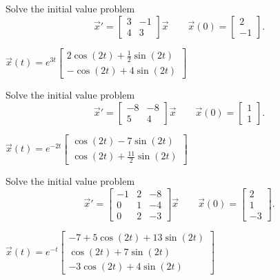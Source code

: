 \begin{exercise}
Solve the initial value problem
\[ {\vec{x}}' = \begin{bmatrix} 3 & -1 \\ 4 & 3 \end{bmatrix} \vec{x} \qquad \vec{x}(0) = \begin{bmatrix} 2 \\ -1 \end{bmatrix}. \]
\end{exercise}
\comboSol{%
}
{%
$\vec{x}(t) = e^{3t} \left[\begin{smallmatrix}2\cos(2t) + \frac{1}{2}\sin(2t) \\ -\cos(2t) + 4\sin(2t) \end{smallmatrix}\right]$
}


\begin{exercise}
Solve the initial value problem
\[ {\vec{x}}' = \begin{bmatrix} -8 & -8 \\ 5 & 4 \end{bmatrix} \vec{x} \qquad \vec{x}(0) = \begin{bmatrix} 1 \\ 1 \end{bmatrix}. \]
\end{exercise}
\comboSol{%
}
{%
$\vec{x}(t) = e^{-2t}\left[\begin{smallmatrix} \cos(2t) - 7\sin(2t)\\ \cos(2t) + \frac{11}{2}\sin(2t) \end{smallmatrix}\right]$
}

\begin{exercise}
Solve the initial value problem
\[ {\vec{x}}' = \begin{bmatrix}-1 & 2 & -8 \\ 0 & 1 & -4 \\ 0 & 2 & -3 \end{bmatrix} \vec{x} \qquad \vec{x}(0) = \begin{bmatrix} 2 \\ 1 \\ -3 \end{bmatrix}. \]
\end{exercise}
\comboSol{%
}
{%
$\vec{x}(t) = e^{-t}\left[\begin{smallmatrix} -7 + 5\cos(2t) + 13\sin(2t) \\ \cos(2t) + 7\sin(2t) \\ -3\cos(2t) + 4\sin(2t) \end{smallmatrix}\right]$
}

\setcounter{exercise}{100}












